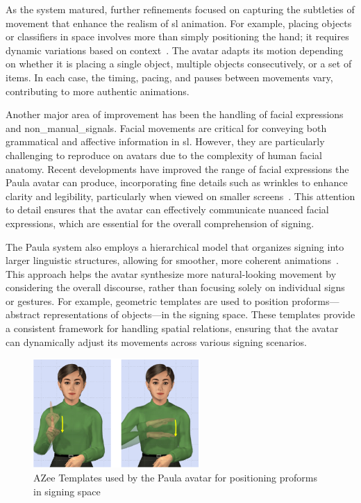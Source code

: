 \documentclass[../../main.tex]{subfiles}
\begin{document}
As the system matured, further refinements focused on capturing the subtleties of movement that enhance the realism of \gls{sl} animation. For example, placing objects or classifiers in space involves more than simply positioning the hand; it requires dynamic variations based on context~\cite{mcdonald2019fine}. The avatar adapts its motion depending on whether it is placing a single object, multiple objects consecutively, or a set of items. In each case, the timing, pacing, and pauses between movements vary, contributing to more authentic animations.

Another major area of improvement has been the handling of facial expressions and \gls{non_manual_signals}. Facial movements are critical for conveying both grammatical and affective information in \gls{sl}. However, they are particularly challenging to reproduce on avatars due to the complexity of human facial anatomy. Recent developments have improved the range of facial expressions the Paula avatar can produce, incorporating fine details such as wrinkles to enhance clarity and legibility, particularly when viewed on smaller screens~\cite{johnson2021towards}. This attention to detail ensures that the avatar can effectively communicate nuanced facial expressions, which are essential for the overall comprehension of signing.

The Paula system also employs a hierarchical model that organizes signing into larger linguistic structures, allowing for smoother, more coherent animations~\cite{filhol2018extending}. This approach helps the avatar synthesize more natural-looking movement by considering the overall discourse, rather than focusing solely on individual signs or gestures. For example, geometric templates are used to position proforms—abstract representations of objects—in the signing space. These templates provide a consistent framework for handling spatial relations, ensuring that the avatar can dynamically adjust its movements across various signing scenarios.

\begin{figure}
    \centering \includegraphics[width = 2.5in]{chapters/background_work/images/azee_template_example.png}
    \caption{AZee Templates used by the Paula avatar for positioning proforms in signing space}
    \label{fig:azee_geo_template_example}
\end{figure}
\end{document}
